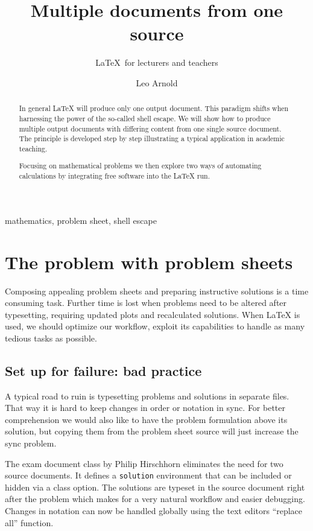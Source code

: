 \documentclass{maps}
\begin{document}
\title{Multiple documents from one source}
\subtitle{\LaTeX\ for lecturers and teachers}
\author{Leo Arnold}

\maketitle

\begin{abstract}
In general \LaTeX{} will produce only one output document. This paradigm shifts when harnessing the power of the so-called shell escape. We will show how to produce multiple output documents with differing content from one single source document. The principle is developed step by step illustrating a typical application in academic teaching.

Focusing on mathematical problems we then explore two ways of automating calculations by integrating free software into the \LaTeX{} run.
\end{abstract}

\begin{keywords}
mathematics, problem sheet, shell escape
\end{keywords}

\section{The problem with problem sheets}
Composing appealing problem sheets and preparing instructive solutions is a time consuming task. Further time is lost when problems need to be altered after typesetting, requiring updated plots and recalculated solutions. When \LaTeX{} is used, we should optimize our workflow, exploit its capabilities to handle as many tedious tasks as possible.

\subsection{Set up for failure: bad practice}

A typical road to ruin is typesetting problems and solutions in separate files. That way it is hard to keep changes in order or notation in sync. For better comprehension we would also like to have the problem formulation above its solution, but copying them from the problem sheet source will just increase the sync problem.

The exam document class by Philip Hirschhorn \cite{arn:hirschhorn} eliminates the need for two source documents. It defines a \texttt{solution} environment that can be included or hidden via a class option. The solutions are typeset in the source document right after the problem which makes for a very natural workflow and easier debugging. Changes in notation can now be handled globally using the text editors \enquote{replace all} function.
\end{document}
